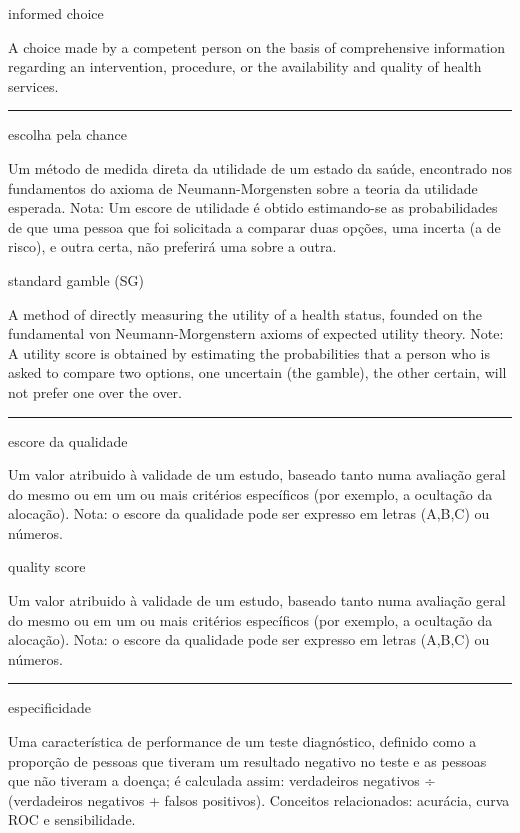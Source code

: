 \documentclass[
  openany]{book}
\begin{document}
informed choice

A choice made by a competent person on the basis of comprehensive information regarding an intervention, procedure, or the availability and quality of health services.

\begin{center}\rule{0.5\linewidth}{0.5pt}\end{center}

escolha pela chance

Um método de medida direta da utilidade de um estado da saúde, encontrado nos fundamentos do axioma de Neumann-Morgensten sobre a teoria da utilidade esperada. Nota: Um escore de utilidade é obtido estimando-se as probabilidades de que uma pessoa que foi solicitada a comparar duas opções, uma incerta (a de risco), e outra certa, não preferirá uma sobre a outra.

standard gamble (SG)

A method of directly measuring the utility of a health status, founded on the fundamental von Neumann-Morgenstern axioms of expected utility theory. Note: A utility score is obtained by estimating the probabilities that a person who is asked to compare two options, one uncertain (the gamble), the other certain, will not prefer one over the over.

\begin{center}\rule{0.5\linewidth}{0.5pt}\end{center}

escore da qualidade

Um valor atribuido à validade de um estudo, baseado tanto numa avaliação geral do mesmo ou em um ou mais critérios específicos (por exemplo, a ocultação da alocação). Nota: o escore da qualidade pode ser expresso em letras (A,B,C) ou números.

quality score

Um valor atribuido à validade de um estudo, baseado tanto numa avaliação geral do mesmo ou em um ou mais critérios específicos (por exemplo, a ocultação da alocação). Nota: o escore da qualidade pode ser expresso em letras (A,B,C) ou números.

\begin{center}\rule{0.5\linewidth}{0.5pt}\end{center}

especificidade

Uma característica de performance de um teste diagnóstico, definido como a proporção de pessoas que tiveram um resultado negativo no teste e as pessoas que não tiveram a doença; é calculada assim: verdadeiros negativos ÷ (verdadeiros negativos + falsos positivos). Conceitos relacionados: acurácia, curva ROC e sensibilidade.
\end{document}
